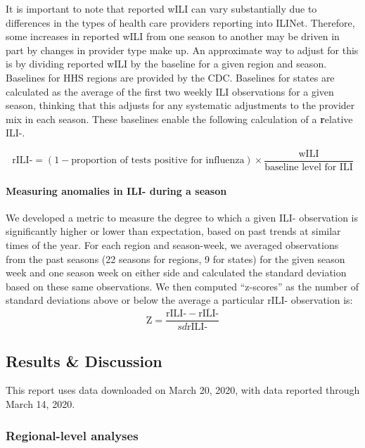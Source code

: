 \documentclass[]{article}
\let\oldparagraph\paragraph
\renewcommand{\paragraph}[1]{\oldparagraph{#1}\mbox{}}
\begin{document}
It is important to note that reported wILI can vary substantially due to
differences in the types of health care providers reporting into ILINet.
Therefore, some increases in reported wILI from one season to another
may be driven in part by changes in provider type make up. An
approximate way to adjust for this is by dividing reported wILI by the
baseline for a given region and season. Baselines for HHS regions are
provided by the CDC. Baselines for states are calculated as the average
of the first two weekly ILI observations for a given season, thinking
that this adjusts for any systematic adjustments to the provider mix in
each season. These baselines enable the following calculation of a
\textbf{r}elative ILI-.

\[\text{rILI-} = (1 - \text{proportion of tests positive for influenza}) \times \frac{\text{wILI}}{\text{baseline level for ILI}}\]

\hypertarget{measuring-anomalies-in-ili--during-a-season}{%
\paragraph{Measuring anomalies in ILI- during a
season}\label{measuring-anomalies-in-ili--during-a-season}}

We developed a metric to measure the degree to which a given ILI-
observation is significantly higher or lower than expectation, based on
past trends at similar times of the year. For each region and
season-week, we averaged observations from the past seasons (22 seasons
for regions, 9 for states) for the given season week and one season week
on either side and calculated the standard deviation based on these same
observations. We then computed ``z-scores'' as the number of standard
deviations above or below the average a particular rILI- observation is:
\[\text{Z} =  \frac{\text{rILI-} - \overline{\text{rILI-}}}{sd{\text{rILI-}}}\]

\hypertarget{results-discussion}{%
\subsection{Results \& Discussion}\label{results-discussion}}

This report uses data downloaded on March 20, 2020, with data reported
through March 14, 2020.

\hypertarget{regional-level-analyses}{%
\subsubsection{Regional-level analyses}\label{regional-level-analyses}}
\end{document}
